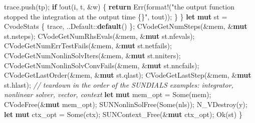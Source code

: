 \documentclass[
  10pt,
]{article}
\newenvironment{Shaded}{}{}
\newcommand{\BuiltInTok}[1]{\textcolor[rgb]{0.00,0.50,0.00}{#1}}
\newcommand{\CommentTok}[1]{\textcolor[rgb]{0.38,0.63,0.69}{\textit{#1}}}
\newcommand{\ConstantTok}[1]{\textcolor[rgb]{0.53,0.00,0.00}{#1}}
\newcommand{\ControlFlowTok}[1]{\textcolor[rgb]{0.00,0.44,0.13}{\textbf{#1}}}
\newcommand{\KeywordTok}[1]{\textcolor[rgb]{0.00,0.44,0.13}{\textbf{#1}}}
\newcommand{\NormalTok}[1]{#1}
\newcommand{\OperatorTok}[1]{\textcolor[rgb]{0.40,0.40,0.40}{#1}}
\newcommand{\PreprocessorTok}[1]{\textcolor[rgb]{0.74,0.48,0.00}{#1}}
\newcommand{\StringTok}[1]{\textcolor[rgb]{0.25,0.44,0.63}{#1}}
\begin{document}
\begin{Shaded}
\begin{Highlighting}[]
\NormalTok{        trace}\OperatorTok{.}\NormalTok{push(tp)}\OperatorTok{;}
        \ControlFlowTok{if} \OperatorTok{!}\NormalTok{out(i}\OperatorTok{,}\NormalTok{ t}\OperatorTok{,} \OperatorTok{\&}\NormalTok{w) }\OperatorTok{\{}
            \ControlFlowTok{return} \ConstantTok{Err}\NormalTok{(}\PreprocessorTok{format!}\NormalTok{(}\StringTok{"the output function stopped the integration at the output time \{\}"}\OperatorTok{,}\NormalTok{ tout))}\OperatorTok{;}
        \OperatorTok{\}}
    \OperatorTok{\}}
    \KeywordTok{let} \KeywordTok{mut}\NormalTok{ st }\OperatorTok{=}\NormalTok{ CvodeStats }\OperatorTok{\{}\NormalTok{ trace}\OperatorTok{,} \OperatorTok{..}\BuiltInTok{Default}\PreprocessorTok{::}\KeywordTok{default}\NormalTok{() }\OperatorTok{\};}
\NormalTok{    CVodeGetNumSteps(}\OperatorTok{\&}\NormalTok{mem}\OperatorTok{,} \OperatorTok{\&}\KeywordTok{mut}\NormalTok{ st}\OperatorTok{.}\NormalTok{nsteps)}\OperatorTok{;}
\NormalTok{    CVodeGetNumRhsEvals(}\OperatorTok{\&}\NormalTok{mem}\OperatorTok{,} \OperatorTok{\&}\KeywordTok{mut}\NormalTok{ st}\OperatorTok{.}\NormalTok{nfevals)}\OperatorTok{;}
\NormalTok{    CVodeGetNumErrTestFails(}\OperatorTok{\&}\NormalTok{mem}\OperatorTok{,} \OperatorTok{\&}\KeywordTok{mut}\NormalTok{ st}\OperatorTok{.}\NormalTok{netfails)}\OperatorTok{;}
\NormalTok{    CVodeGetNumNonlinSolvIters(}\OperatorTok{\&}\NormalTok{mem}\OperatorTok{,} \OperatorTok{\&}\KeywordTok{mut}\NormalTok{ st}\OperatorTok{.}\NormalTok{nniters)}\OperatorTok{;}
\NormalTok{    CVodeGetNumNonlinSolvConvFails(}\OperatorTok{\&}\NormalTok{mem}\OperatorTok{,} \OperatorTok{\&}\KeywordTok{mut}\NormalTok{ st}\OperatorTok{.}\NormalTok{nncfails)}\OperatorTok{;}
\NormalTok{    CVodeGetLastOrder(}\OperatorTok{\&}\NormalTok{mem}\OperatorTok{,} \OperatorTok{\&}\KeywordTok{mut}\NormalTok{ st}\OperatorTok{.}\NormalTok{qlast)}\OperatorTok{;}
\NormalTok{    CVodeGetLastStep(}\OperatorTok{\&}\NormalTok{mem}\OperatorTok{,} \OperatorTok{\&}\KeywordTok{mut}\NormalTok{ st}\OperatorTok{.}\NormalTok{hlast)}\OperatorTok{;}
    \CommentTok{// teardown in the order of the SUNDIALS examples: integrator, nonlinear solver, vector, context}
    \KeywordTok{let} \KeywordTok{mut}\NormalTok{ mem\_opt }\OperatorTok{=} \ConstantTok{Some}\NormalTok{(mem)}\OperatorTok{;}
\NormalTok{    CVodeFree(}\OperatorTok{\&}\KeywordTok{mut}\NormalTok{ mem\_opt)}\OperatorTok{;}
\NormalTok{    SUNNonlinSolFree(}\ConstantTok{Some}\NormalTok{(nls))}\OperatorTok{;}
\NormalTok{    N\_VDestroy(y)}\OperatorTok{;}
    \KeywordTok{let} \KeywordTok{mut}\NormalTok{ ctx\_opt }\OperatorTok{=} \ConstantTok{Some}\NormalTok{(ctx)}\OperatorTok{;}
\NormalTok{    SUNContext\_Free(}\OperatorTok{\&}\KeywordTok{mut}\NormalTok{ ctx\_opt)}\OperatorTok{;}
    \ConstantTok{Ok}\NormalTok{(st)}
\OperatorTok{\}}


\end{Highlighting}
\end{Shaded}
\end{document}
